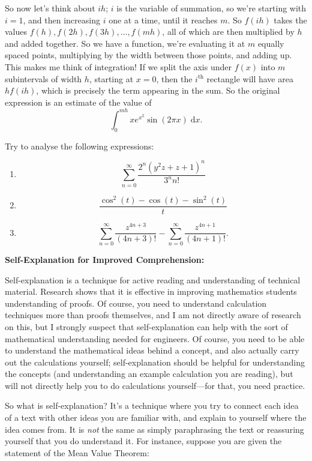 \documentclass{article}
\newcommand{\diff}{\;\mathrm{d}}
\begin{document}
So now let's think about $ih$; $i$ is the variable of summation, so we're starting with $i=1$, and then increasing $i$ one at a time, until it reaches $m$. So $f(ih)$ takes the values $f(h),f(2h),f(3h),\hdots,f(mh)$, all of which are then multiplied by $h$ and added together. So we have a function, we're evaluating it at $m$ equally spaced points, multiplying by the width between those points, and adding up. This makes me think of integration! If we split the axis under $f(x)$ into $m$ subintervals of width $h$, starting at $x=0$, then the $i^\mathrm{th}$ rectangle will have area $hf(ih)$, which is precisely the term appearing in the sum. So the original expression is an estimate of the value of 
\[\int_0^{mh} xe^{x^2}\sin(2\pi x)\diff x.\]

\bigskip

Try to analyse the following expressions:

\begin{enumerate}
	\item \[\sum_{n=0}^\infty \frac{2^n(y^2z+z+1)^n}{3^n n!}\]
	\item \[\frac{\cos^2(t)-\cos(t)-\sin^2(t)}{t}\]
	\item \[\sum_{n=0}^\infty \frac{z^{4n+3}}{(4n+3)!} - \sum_{n=0}^\infty \frac{z^{4n+1}}{(4n+1)!}.\]
\end{enumerate}


\clearpage



\textbf{Self-Explanation for Improved Comprehension:}\bigskip


Self-explanation is a technique for active reading and understanding of technical material. Research shows that it is effective in improving mathematics students understanding of proofs. Of course, you need to understand calculation techniques more than proofs themselves, and I am not directly aware of research on this, but I strongly suspect that self-explanation can help with the sort of mathematical understanding needed for engineers. Of course, you need to be able to understand the mathematical ideas behind a concept, and also actually carry out the calculations yourself; self-explanation should be helpful for understanding the concepts (and understanding an example calculation you are reading), but will not directly help you to do calculations yourself---for that, you need practice.


So what is self-explanation? It's a technique where you try to connect each idea of a text with other ideas you are familiar with, and explain to yourself where the idea comes from. It is \textit{not} the same as simply paraphrasing the text or reassuring yourself that you do understand it. For instance, suppose you are given the statement of the Mean Value Theorem:\medskip
\end{document}
